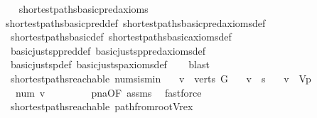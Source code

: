 \begin{isabellebody}
%
\isadelimproof
\ \ %
\endisadelimproof
%
\isatagproof
{}\isamarkupfalse%
\ shortest{\isacharunderscore}paths{\isacharunderscore}basic{\isacharunderscore}pred{\isacharunderscore}axioms\ \isanewline
\ \ \isamarkupfalse%
\ shortest{\isacharunderscore}paths{\isacharunderscore}basic{\isacharunderscore}pred{\isacharunderscore}def\ shortest{\isacharunderscore}paths{\isacharunderscore}basic{\isacharunderscore}pred{\isacharunderscore}axioms{\isacharunderscore}def\ \isanewline
\ \ shortest{\isacharunderscore}paths{\isacharunderscore}basic{\isacharunderscore}def\ shortest{\isacharunderscore}paths{\isacharunderscore}basic{\isacharunderscore}axioms{\isacharunderscore}def\ \isanewline
\ \ basic{\isacharunderscore}just{\isacharunderscore}sp{\isacharunderscore}pred{\isacharunderscore}def\ basic{\isacharunderscore}just{\isacharunderscore}sp{\isacharunderscore}pred{\isacharunderscore}axioms{\isacharunderscore}def\ \isanewline
\ \ basic{\isacharunderscore}just{\isacharunderscore}sp{\isacharunderscore}def\ basic{\isacharunderscore}just{\isacharunderscore}sp{\isacharunderscore}axioms{\isacharunderscore}def\isanewline
\ \ \isamarkupfalse%
\ blast%
\endisatagproof
{\isafoldproof}%
%
\isadelimproof
\isanewline
%
\endisadelimproof
\isanewline
{}\isamarkupfalse%
\ {\isacharparenleft}\ shortest{\isacharunderscore}paths{\isacharunderscore}reachable{\isacharparenright}\ num{\isacharunderscore}s{\isacharunderscore}is{\isacharunderscore}min{\isacharcolon}\isanewline
\ \ \ {\isachardoublequoteopen}v\ {\isasymin}\ verts\ G{\isachardoublequoteclose}\isanewline
\ \ \ {\isachardoublequoteopen}v\ {\isasymnoteq}\ s{\isachardoublequoteclose}\isanewline
\ \ \ {\isachardoublequoteopen}v\ {\isasymnotin}\ V\isactrlsub p{\isachardoublequoteclose}\isanewline
\ \ \ {\isachardoublequoteopen}num\ v\ {\isachargreater}\ {}{\isachardoublequoteclose}\isanewline
%
\isadelimproof
\ \ \ \ \ %
\endisadelimproof
%
\isatagproof
{}\isamarkupfalse%
\ pna{\isacharbrackleft}OF\ assms{\isacharbrackright}\ \isamarkupfalse%
\ fastforce%
\endisatagproof
{\isafoldproof}%
%
\isadelimproof
\isanewline
%
\endisadelimproof
\isanewline
\isanewline
{}\isamarkupfalse%
\ {\isacharparenleft}\ shortest{\isacharunderscore}paths{\isacharunderscore}reachable{\isacharparenright}\ path{\isacharunderscore}from{\isacharunderscore}root{\isacharunderscore}Vr{\isacharunderscore}ex{\isacharcolon}\isanewline

\end{isabellebody}
